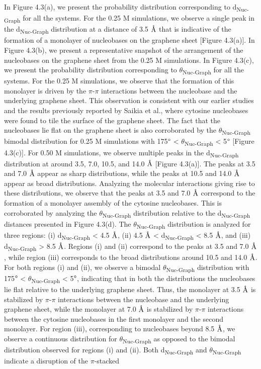 In Figure 4.3(a), we present the probability distribution corresponding to d\textsubscript{Nuc-Graph} for all the systems. For the 0.25 M simulations, we observe a single peak in the d\textsubscript{Nuc-Graph} distribution at a distance of 3.5 $\text{\normalfont\AA}$ that is indicative of the formation of a monolayer of nucleobases on the graphene sheet [Figure 4.3(a)]. In Figure 4.3(b), we present a representative snapshot of the arrangement of the nucleobases on the graphene sheet from the 0.25 M simulations. In Figure 4.3(c), we present the probability distribution corresponding to $\theta$\textsubscript{Nuc-Graph} for all the systems. For the 0.25 M simulations, we observe that the formation of this monolayer is driven by the $\pi$-$\pi$ interactions between the nucleobase and the underlying graphene sheet. This observation is consistent with our earlier studies\supercite{h_polarization_2021} and the results previously reported by Saikia et al., where cytosine nucleobases were found to tile the surface of the graphene sheet.\supercite{saikia_dynamics_2018} The fact that the nucleobases lie flat on the graphene sheet is also corroborated by the $\theta$\textsubscript{Nuc-Graph} bimodal distribution for 0.25 M simulations with 175$\degree$ < $\theta$\textsubscript{Nuc-Graph} < 5$\degree$ [Figure 4.3(c)]. For 0.50 M simulations, we observe multiple peaks in the d\textsubscript{Nuc-Graph} distribution at around 3.5, 7.0, 10.5, and 14.0 $\text{\normalfont\AA}$ [Figure 4.3(a)]. The peaks at 3.5 and 7.0 $\text{\normalfont\AA}$ appear as sharp distributions, while the peaks at 10.5 and 14.0 $\text{\normalfont\AA}$ appear as broad distributions. Analyzing the molecular interactions giving rise to these distributions, we observe that the peaks at 3.5 and 7.0 $\text{\normalfont\AA}$ correspond to the formation of a monolayer assembly of the cytosine nucleobases. This is corroborated by analyzing the $\theta$\textsubscript{Nuc-Graph} distribution relative to the d\textsubscript{Nuc-Graph} distances presented in Figure 4.3(d). The $\theta$\textsubscript{Nuc-Graph} distribution is analyzed for three regions: (i) d\textsubscript{Nuc-Graph} < 4.5 $\text{\normalfont\AA}$, (ii) 4.5 $\text{\normalfont\AA}$ < d\textsubscript{Nuc-Graph} < 8.5 $\text{\normalfont\AA}$, and (iii) d\textsubscript{Nuc-Graph} > 8.5 $\text{\normalfont\AA}$. Regions (i) and (ii) correspond to the peaks at 3.5 and 7.0 $\text{\normalfont\AA}$, while region (iii) corresponds to the broad distributions around 10.5 and 14.0 $\text{\normalfont\AA}$. For both regions (i) and (ii), we observe a bimodal $\theta$\textsubscript{Nuc-Graph} distribution with 175$\degree$ < $\theta$\textsubscript{Nuc-Graph} < 5$\degree$, indicating that in both the distributions the nucleobases lie flat relative to the underlying graphene sheet. Thus, the monolayer at 3.5 $\text{\normalfont\AA}$ is stabilized by $\pi$-$\pi$ interactions between the nucleobase and the underlying graphene sheet, while the monolayer at 7.0 $\text{\normalfont\AA}$ is stabilized by $\pi$-$\pi$ interactions between the cytosine nucleobases in the first monolayer and the second monolayer. For region (iii), corresponding to nucleobases beyond 8.5 $\text{\normalfont\AA}$, we observe a continuous distribution for $\theta$\textsubscript{Nuc-Graph} as opposed to the bimodal distribution observed for regions (i) and (ii). Both d\textsubscript{Nuc-Graph} and $\theta$\textsubscript{Nuc-Graph} indicate a disruption of the $\pi$-stacked 